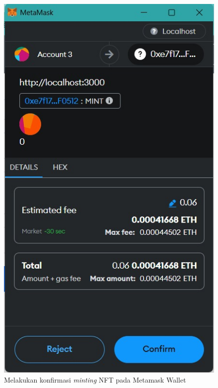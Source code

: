 \begin{itemize}
        \begin{figure} [H] \centering
          \includegraphics[scale=0.43]{gambar/confirm_create.jpg}
          \caption{Melakukan konfirmasi \emph{minting} NFT pada Metamask Wallet}
          \label{fig:makenft}
          \end{figure}
      

\end{itemize}

